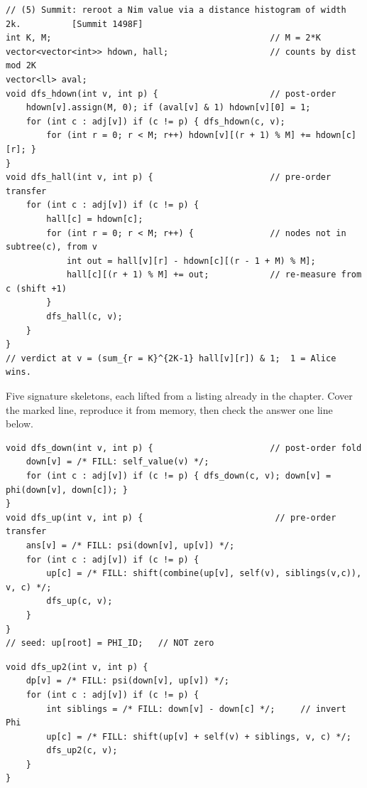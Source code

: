 \begin{lstlisting}
// (5) Summit: reroot a Nim value via a distance histogram of width 2k.          [Summit 1498F]
int K, M;                                           // M = 2*K
vector<vector<int>> hdown, hall;                    // counts by dist mod 2K
vector<ll> aval;
void dfs_hdown(int v, int p) {                      // post-order
    hdown[v].assign(M, 0); if (aval[v] & 1) hdown[v][0] = 1;
    for (int c : adj[v]) if (c != p) { dfs_hdown(c, v);
        for (int r = 0; r < M; r++) hdown[v][(r + 1) % M] += hdown[c][r]; }
}
void dfs_hall(int v, int p) {                       // pre-order transfer
    for (int c : adj[v]) if (c != p) {
        hall[c] = hdown[c];
        for (int r = 0; r < M; r++) {               // nodes not in subtree(c), from v
            int out = hall[v][r] - hdown[c][(r - 1 + M) % M];
            hall[c][(r + 1) % M] += out;            // re-measure from c (shift +1)
        }
        dfs_hall(c, v);
    }
}
// verdict at v = (sum_{r = K}^{2K-1} hall[v][r]) & 1;  1 = Alice wins.
\end{lstlisting}


Five signature skeletons, each lifted from a listing already in the
chapter. Cover the marked line, reproduce it from memory, then check the
answer one line below.

\begin{lstlisting}[caption={Drill 1 -- the two-DFS template with a closed-form edge transfer (from \coderef{c20-twodfs})}]
void dfs_down(int v, int p) {                       // post-order fold
    down[v] = /* FILL: self_value(v) */;
    for (int c : adj[v]) if (c != p) { dfs_down(c, v); down[v] = phi(down[v], down[c]); }
}
void dfs_up(int v, int p) {                          // pre-order transfer
    ans[v] = /* FILL: psi(down[v], up[v]) */;
    for (int c : adj[v]) if (c != p) {
        up[c] = /* FILL: shift(combine(up[v], self(v), siblings(v,c)), v, c) */;
        dfs_up(c, v);
    }
}
// seed: up[root] = PHI_ID;   // NOT zero
\end{lstlisting}

\begin{lstlisting}[caption={Drill 2 -- invertible pair reroot, subtract the child (from \coderef{c20-updown})}]
void dfs_up2(int v, int p) {
    dp[v] = /* FILL: psi(down[v], up[v]) */;
    for (int c : adj[v]) if (c != p) {
        int siblings = /* FILL: down[v] - down[c] */;     // invert Phi
        up[c] = /* FILL: shift(up[v] + self(v) + siblings, v, c) */;
        dfs_up2(c, v);
    }
}
\end{lstlisting}


